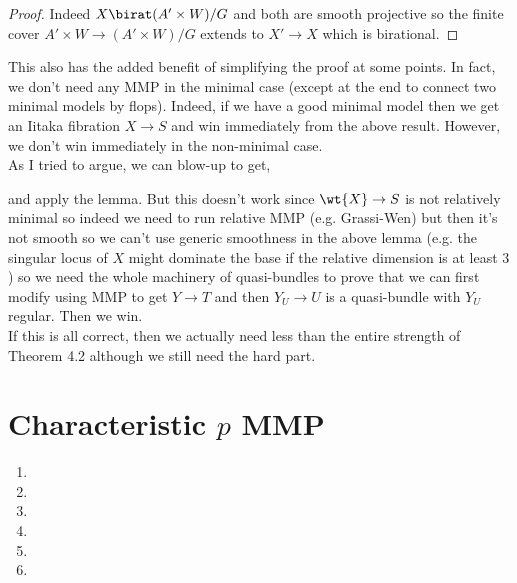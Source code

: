 \documentclass[12pt]{article}
\begin{document}
\begin{proof}
Indeed $X \birat (A' \times W)/G$ and both are smooth projective so the finite \etale cover $A' \times W \to (A' \times W)/G$ extends to $X' \to X$ which is birational.
\end{proof}

This also has the added benefit of simplifying the proof at some points. In fact, we don't need any MMP in the minimal case (except at the end to connect two minimal models by flops). Indeed, if we have a good minimal model then we get an Iitaka fibration $X \to S$ and win immediately from the above result. However, we don't win immediately in the non-minimal case. 
\bigskip\\
As I tried to argue, we can blow-up to get,
\begin{center}
\end{center}
and apply the lemma. But this doesn't work since $\wt{X} \to S$ is not relatively minimal so indeed we need to run relative MMP (e.g. Grassi-Wen) but then it's not smooth so we can't use generic smoothness in the above lemma (e.g. the singular locus of $X$ might dominate the base if the relative dimension is at least $3$) so we need the whole machinery of quasi-bundles to prove that we can first modify using MMP to get $Y \to T$ and then $Y_U \to U$ is a quasi-bundle with $Y_U$ regular. Then we win. 
\bigskip\\
If this is all correct, then we actually need less than the entire strength of Theorem 4.2 although we still need the hard part.

\section{Characteristic $p$ MMP}

\begin{enumerate}
\item {}

\item {}

\item {}

\item {}

\item {}

\item 
\end{enumerate}
\end{document}
